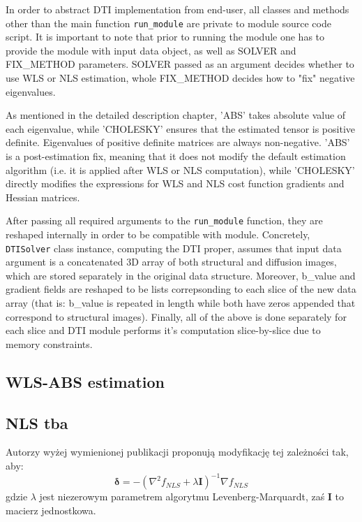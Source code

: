 In order to abstract DTI implementation from end-user, all classes and methods other than the main function \texttt{run\_module} are private to module source code script. It is important to note that prior to running the module one has to provide the module with input data object, as well as SOLVER and FIX\_METHOD parameters. SOLVER passed as an argument decides whether to use WLS or NLS estimation, whole FIX\_METHOD decides how to "fix" negative eigenvalues. 

As mentioned in the detailed description chapter, 'ABS' takes absolute value of each eigenvalue, while 'CHOLESKY' ensures that the estimated tensor is positive definite. Eigenvalues of positive definite matrices are always non-negative. 'ABS' is a post-estimation fix, meaning that it does not modify the default estimation algorithm (i.e. it is applied after WLS or NLS computation), while 'CHOLESKY' directly modifies the expressions for WLS and NLS cost function gradients and Hessian matrices.

After passing all required arguments to the \texttt{run\_module} function, they are reshaped internally in order to be compatible with module. Concretely, \texttt{DTISolver} class instance, computing the DTI proper, assumes that input data argument is a concatenated 3D array of both structural and diffusion images, which are stored separately in the original data structure. Moreover, b\_value and gradient fields are reshaped to be lists correpsonding to each slice of the new data array (that is: b\_value is repeated in length while both have zeros appended that correspond to structural images). Finally, all of the above is done separately for each slice and DTI module performs it's computation slice-by-slice due to memory constraints.

\subsection{WLS-ABS estimation}








\subsection{NLS tba}

Autorzy wyżej wymienionej publikacji proponują modyfikację tej zależności tak, aby:
\begin{equation}
\boldsymbol{\delta}=-\left(\nabla^2{f_{NLS}}+\lambda \boldsymbol{I}\right)^{-1}\nabla{f_{NLS}}
\label{Eq:m6_eq_22}
\end{equation}
gdzie $\lambda$ jest niezerowym parametrem algorytmu Levenberg-Marquardt, zaś $\boldsymbol{I}$ to macierz jednostkowa.

